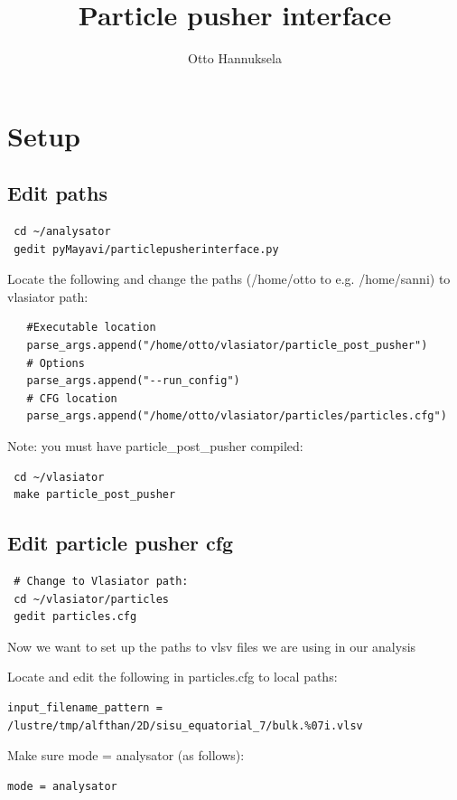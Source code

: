 \documentclass[a4paper,10pt]{article}
\title{Particle pusher interface}
\author{Otto Hannuksela}
\begin{document}
\maketitle

\section{Setup}

\subsection{Edit paths}

\begin{verbatim}
 cd ~/analysator
 gedit pyMayavi/particlepusherinterface.py
\end{verbatim}

Locate the following and change the paths (/home/otto to e.g. /home/sanni) to vlasiator path:

\begin{verbatim}
   #Executable location
   parse_args.append("/home/otto/vlasiator/particle_post_pusher")
   # Options
   parse_args.append("--run_config")
   # CFG location
   parse_args.append("/home/otto/vlasiator/particles/particles.cfg")
\end{verbatim}

Note: you must have particle\_post\_pusher compiled:

\begin{verbatim}
 cd ~/vlasiator
 make particle_post_pusher
\end{verbatim}


\subsection{Edit particle pusher cfg}

\begin{verbatim}
 # Change to Vlasiator path:
 cd ~/vlasiator/particles
 gedit particles.cfg
\end{verbatim}

Now we want to set up the paths to vlsv files we are using in our analysis

Locate and edit the following in particles.cfg to local paths:

\begin{verbatim}
input_filename_pattern = /lustre/tmp/alfthan/2D/sisu_equatorial_7/bulk.%07i.vlsv
\end{verbatim}

Make sure mode = analysator (as follows):
\begin{verbatim}
mode = analysator
\end{verbatim}
\end{document}
